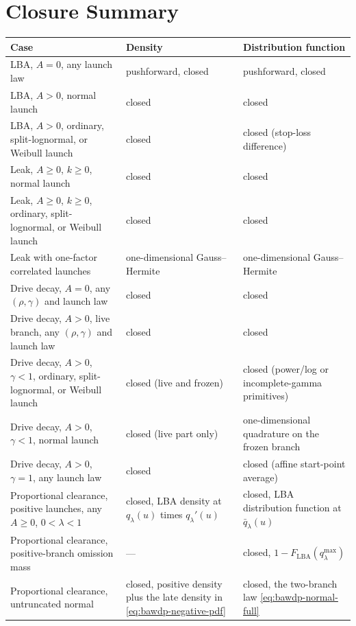 \documentclass[12pt]{article}
\theoremstyle{remark}
\begin{document}
\section{Closure Summary}
\label{sec:closure-summary}
\begin{center}
\small
\begin{tabular}{p{}p{}p{}}
\toprule
Case & Density & Distribution function \\
\midrule
LBA, $A = 0$, any launch law & pushforward, closed & pushforward, closed \\
LBA, $A > 0$, normal launch & closed & closed \\
LBA, $A > 0$, ordinary, split-lognormal, or Weibull launch & closed & closed (stop-loss difference) \\
Leak, $A \ge 0$, $k \ge 0$, normal launch & closed & closed \\
Leak, $A \ge 0$, $k \ge 0$, ordinary, split-lognormal, or Weibull launch & closed & closed \\
Leak with one-factor correlated launches & one-dimensional Gauss--Hermite & one-dimensional Gauss--Hermite \\
Drive decay, $A = 0$, any $(\rho,\gamma)$ and launch law & closed & closed \\
Drive decay, $A > 0$, live branch, any $(\rho,\gamma)$ and launch law & closed & closed \\
Drive decay, $A > 0$, $\gamma<1$, ordinary, split-lognormal, or Weibull launch &
closed (live and frozen) & closed (power/log or incomplete-gamma primitives) \\
Drive decay, $A > 0$, $\gamma<1$, normal launch &
closed (live part only) & one-dimensional quadrature on the frozen branch \\
Drive decay, $A > 0$, $\gamma=1$, any launch law &
closed & closed (affine start-point average) \\
Proportional clearance, positive launches, any $A \ge 0$, $0<\lambda<1$ &
closed, LBA density at $q_{\lambda}(u)$ times $q_{\lambda}'(u)$ &
closed, LBA distribution function at $\bar q_{\lambda}(u)$ \\
Proportional clearance, positive-branch omission mass &
--- & closed, $1-F_{\mathrm{LBA}}(q_{\lambda}^{\max})$ \\
Proportional clearance, untruncated normal &
closed, positive density plus the late density in
\eqref{eq:bawdp-negative-pdf} &
closed, the two-branch law \eqref{eq:bawdp-normal-full} \\

\end{tabular}
\end{center}
\end{document}
